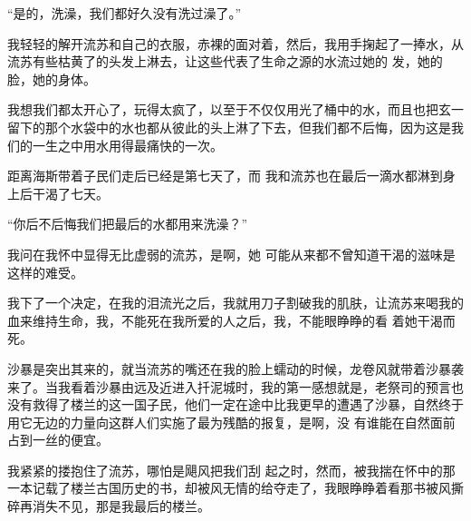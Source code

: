 \documentclass{article}
\begin{document}
“是的，洗澡，我们都好久没有洗过澡了。”

我轻轻的解开流苏和自己的衣服，赤裸的面对着，然后，我用手掬起了一捧水，从流苏有些枯黄了的头发上淋去，让这些代表了生命之源的水流过她的
发，她的脸，她的身体。 

我想我们都太开心了，玩得太疯了，以至于不仅仅用光了桶中的水，而且也把玄一留下的那个水袋中的水也都从彼此的头上淋了下去，但我们都不后悔，因为这是我们的一生之中用水用得最痛快的一次。

距离海斯带着子民们走后已经是第七天了，而
\newpage
我和流苏也在最后一滴水都淋到身上后干渴了七天。

“你后不后悔我们把最后的水都用来洗澡？”

我问在我怀中显得无比虚弱的流苏，是啊，她
可能从来都不曾知道干渴的滋味是这样的难受。 

我下了一个决定，在我的泪流光之后，我就用刀子割破我的肌肤，让流苏来喝我的血来维持生命，我，不能死在我所爱的人之后，我，不能眼睁睁的看
着她干渴而死。 

沙暴是突出其来的，就当流苏的嘴还在我的脸上蠕动的时候，龙卷风就带着沙暴袭来了。当我看着沙暴由远及近进入扦泥城时，我的第一感想就是，老祭司的预言也没有救得了楼兰的这一国子民，他们一定在途中比我更早的遭遇了沙暴，自然终于用它无边的力量向这群人们实施了最为残酷的报复，是啊，没
有谁能在自然面前占到一丝的便宜。 

我紧紧的搂抱住了流苏，哪怕是飓风把我们刮
\newpage
起之时，然而，被我揣在怀中的那一本记载了楼兰古国历史的书，却被风无情的给夺走了，我眼睁睁着看那书被风撕碎再消失不见，那是我最后的楼兰。
\end{document}

